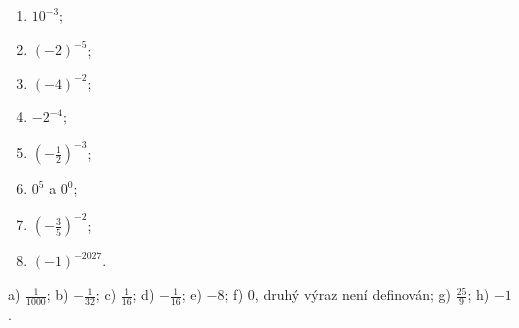 \documentclass[11pt,a4paper]{article}
\begin{document}
\begin{zadaniReseniBox}[title={Samostatná práce 1},breakable=false]
\begin{enumerate}[label=\alph*)]
\item $10^{-3}$; \item $(-2)^{-5}$; \item $(-4)^{-2}$;
\item $-2^{-4}$; \item $\left(-\frac12\right)^{-3}$;
\item $0^5$ a $0^0$; \item $\left(-\frac35\right)^{-2}$;
\item $(-1)^{-2027}$.
\end{enumerate}
\tcblower
 a) $\frac1{1000}$; b) $-\frac1{32}$; c) $\frac1{16}$;
 d) $-\frac1{16}$; e) $-8$; f) $0$, druhý výraz není definován;
 g) $\frac{25}{9}$; h) $-1$.
\end{zadaniReseniBox}
\end{document}
